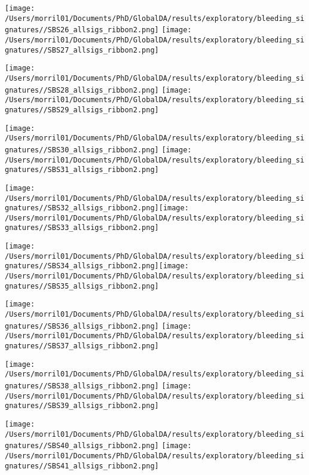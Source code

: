 \documentclass{article}
\begin{document}
\hspace{-1in} \texttt{[image: /Users/morril01/Documents/PhD/GlobalDA/results/exploratory/bleeding\_signatures//SBS26\_allsigs\_ribbon2.png]} \texttt{[image: /Users/morril01/Documents/PhD/GlobalDA/results/exploratory/bleeding\_signatures//SBS27\_allsigs\_ribbon2.png]} 

\hspace{-1in}\texttt{[image: /Users/morril01/Documents/PhD/GlobalDA/results/exploratory/bleeding\_signatures//SBS28\_allsigs\_ribbon2.png]} 
\texttt{[image: /Users/morril01/Documents/PhD/GlobalDA/results/exploratory/bleeding\_signatures//SBS29\_allsigs\_ribbon2.png]} 

\hspace{-1in} \texttt{[image: /Users/morril01/Documents/PhD/GlobalDA/results/exploratory/bleeding\_signatures//SBS30\_allsigs\_ribbon2.png]} \texttt{[image: /Users/morril01/Documents/PhD/GlobalDA/results/exploratory/bleeding\_signatures//SBS31\_allsigs\_ribbon2.png]} 

\hspace{-1in}\texttt{[image: /Users/morril01/Documents/PhD/GlobalDA/results/exploratory/bleeding\_signatures//SBS32\_allsigs\_ribbon2.png]}\texttt{[image: /Users/morril01/Documents/PhD/GlobalDA/results/exploratory/bleeding\_signatures//SBS33\_allsigs\_ribbon2.png]} 

\hspace{-1in}\texttt{[image: /Users/morril01/Documents/PhD/GlobalDA/results/exploratory/bleeding\_signatures//SBS34\_allsigs\_ribbon2.png]}\texttt{[image: /Users/morril01/Documents/PhD/GlobalDA/results/exploratory/bleeding\_signatures//SBS35\_allsigs\_ribbon2.png]} 

\hspace{-1in}\texttt{[image: /Users/morril01/Documents/PhD/GlobalDA/results/exploratory/bleeding\_signatures//SBS36\_allsigs\_ribbon2.png]} \texttt{[image: /Users/morril01/Documents/PhD/GlobalDA/results/exploratory/bleeding\_signatures//SBS37\_allsigs\_ribbon2.png]} 

\hspace{-1in} \texttt{[image: /Users/morril01/Documents/PhD/GlobalDA/results/exploratory/bleeding\_signatures//SBS38\_allsigs\_ribbon2.png]} \texttt{[image: /Users/morril01/Documents/PhD/GlobalDA/results/exploratory/bleeding\_signatures//SBS39\_allsigs\_ribbon2.png]} 
 
\hspace{-1in}  \texttt{[image: /Users/morril01/Documents/PhD/GlobalDA/results/exploratory/bleeding\_signatures//SBS40\_allsigs\_ribbon2.png]} \texttt{[image: /Users/morril01/Documents/PhD/GlobalDA/results/exploratory/bleeding\_signatures//SBS41\_allsigs\_ribbon2.png]} 
\end{document}

